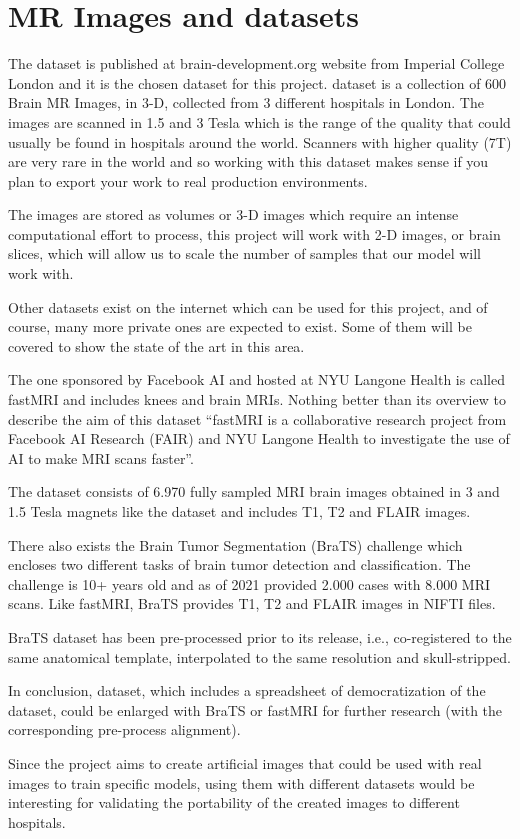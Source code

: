\section{MR Images and datasets}

The  dataset is published at brain-development.org website from Imperial College London and it is the chosen dataset for this project.  dataset is a collection of 600 Brain MR Images, in 3-D, collected from 3 different hospitals in London. The images are scanned in 1.5 and 3 Tesla which is the range of the quality that could usually be found in hospitals around the world. Scanners with higher quality (7T) are very rare in the world and so working with this dataset makes sense if you plan to export your work to real production environments.

The images are stored as volumes or 3-D images which require an intense computational effort to process, this project will work with 2-D images, or brain slices, which will allow us to scale the number of samples that our model will work with.

Other datasets exist on the internet which can be used for this project, and of course, many more private ones are expected to exist. Some of them will be covered to show the state of the art in this area.

The one sponsored by Facebook AI and hosted at NYU Langone Health is called fastMRI and includes knees and brain MRIs. Nothing better than its overview to describe the aim of this dataset “fastMRI is a collaborative research project from Facebook AI Research (FAIR) and NYU Langone Health to investigate the use of AI to make MRI scans faster”. 

The dataset consists of 6.970 fully sampled MRI brain images obtained in 3 and 1.5 Tesla magnets like the  dataset and includes T1, T2 and FLAIR images.

There also exists the Brain Tumor Segmentation (BraTS) challenge \cite{brats} which encloses two different tasks of brain tumor detection and classification. The challenge is 10+ years old and as of 2021 provided 2.000 cases with 8.000 MRI scans. Like fastMRI, BraTS \cite{brats} provides T1, T2 and FLAIR images in NIFTI files.

BraTS \cite{brats} dataset has been pre-processed prior to its release, i.e., co-registered to the same anatomical template, interpolated to the same resolution and skull-stripped.

In conclusion,  dataset, which includes a spreadsheet of democratization of the dataset, could be enlarged with BraTS \cite{brats} or fastMRI for further research (with the corresponding pre-process alignment).

Since the project aims to create artificial images that could be used with real images to train specific models, using them with different datasets would be interesting for validating the portability of the created images to different hospitals. 